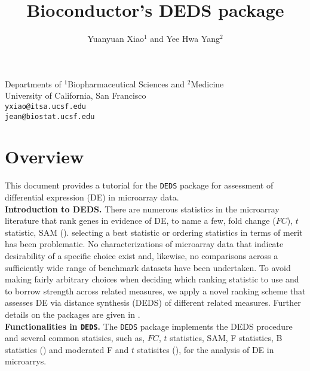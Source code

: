 \documentclass[11pt]{article}
\newcommand{\code}[1]{{\tt #1}}
\begin{document}
\title{\bf Bioconductor's DEDS package}

\author{Yuanyuan Xiao$^1$ and Yee Hwa Yang$^2$}

\maketitle


\begin{center}
Departments of $^1$Biopharmaceutical Sciences and $^2$Medicine \\
University of California, San Francisco\\ 
{\tt yxiao@itsa.ucsf.edu}\\
{\tt jean@biostat.ucsf.edu}
\end{center}



\tableofcontents


\section{Overview}

This document provides a tutorial for the \code{DEDS} package for assessment of
differential expression (DE) in microarray data. \\

{\bf Introduction to DEDS.} There are numerous statistics
in the microarray literature that rank genes in evidence of DE, to name a few, 
fold change ($FC$), $t$ statistic, SAM (\cite{Tusheretal}).  selecting a best statistic or ordering 
statistics in terms of merit has been problematic.  No characterizations of 
microarray data that indicate desirability of a specific choice exist and, 
likewise, no comparisons across a sufficiently wide range of benchmark datasets 
have been undertaken. To avoid making fairly arbitrary choices when deciding which
ranking statistic to use and to borrow strength across related measures, we 
apply a novel ranking scheme that assesses DE via distance synthesis (DEDS) of
different related measures. Further details on the packages are given 
in \cite{DEDS}.\\  

{\bf Functionalities in \code{DEDS}.} The \code{DEDS} package implements the DEDS 
procedure and several common statisics, such as, 
$FC$, $t$ statistics, SAM, F statistics, B statistics (\cite{Ingrid}) and moderated 
F and $t$ statisitcs (\cite{limma}), for the analysis of DE in microarrys. \\
\end{document}
